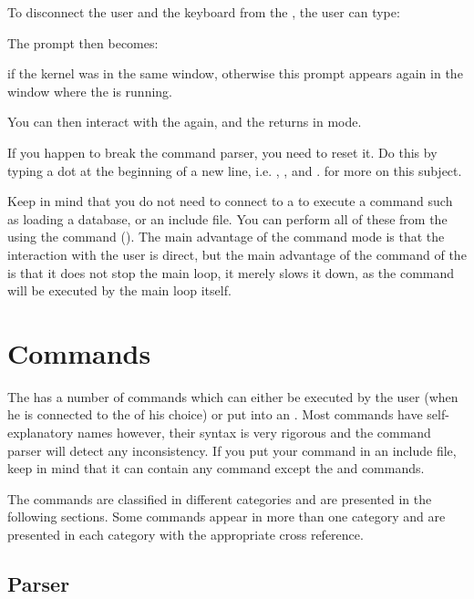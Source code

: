 To disconnect the user and the keyboard from the \CPK{}, the user can
type:


The prompt then becomes:


if the kernel was in the same window, otherwise this prompt appears again
in the window where the \OPRSS{} is running.

You can then interact with the \OPRSS{} again, and the \CPK{} returns in
 mode.

If you happen to break the command parser, you need to reset it. Do this by typing a dot 
 at the beginning of a new line, i.e. ,
, and .  for more on this subject.

Keep in mind that you do not need to connect to a \CPK{} to execute a command
such as loading a database, or an include file. You can perform all of these
from the \OPRSS{} using the  command (). The main advantage of the command mode is that the
interaction with the user is direct, but the main advantage of the
 command of the \OPRSS{} is that it does not stop the \CPK{}
main loop, it merely slows it down, as the command will be executed by the main
loop itself.

\chapter{\CPK{} Commands}

The \CPK{} has a number of commands which can either be executed by the
user (when he is connected to the \CPK{} of his choice) or put into an
. Most commands have self-explanatory names
however, their syntax is very rigorous and the command parser will detect any
inconsistency. If you put your command in an include file, keep in mind that it
can contain any command except the  and 
commands.

The \CPK{} commands are classified in different categories and are presented
in the following sections. Some commands appear in more than
one category and are presented in each category with the appropriate cross
reference.



\section{\CPK{} Parser}


